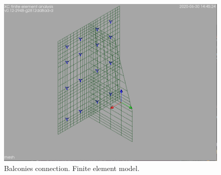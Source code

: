 \begin{figure}
  \begin{center}
    \includegraphics[width=120mm]{figures/balconies_connection_mesh}
  \end{center}
  \caption{Balconies connection. Finite element model.}\label{fg_balconies_connection_mesh}
\end{figure}
